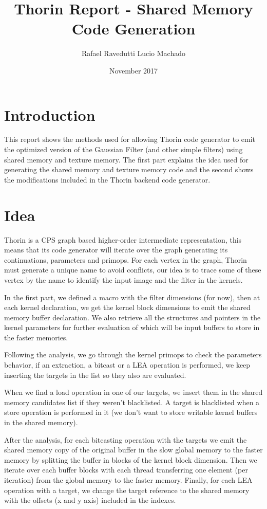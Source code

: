 \documentclass{article}
\title{Thorin Report - Shared Memory Code Generation}
\author{Rafael Ravedutti Lucio Machado }
\date{November 2017}
\begin{document}
\maketitle

\section{Introduction}
This report shows the methods used for allowing Thorin code generator to emit the optimized version of the Gaussian Filter (and other simple filters) using shared memory and texture memory. The first part explains the idea used for generating the shared memory and texture memory code and the second shows the modifications included in the Thorin backend code generator.

\section{Idea}
Thorin is a CPS graph based higher-order intermediate representation, this means that its code generator will iterate over the graph generating its continuations, parameters and primops. For each vertex in the graph, Thorin must generate a unique name to avoid conflicts, our idea is to trace some of these vertex by the name to identify the input image and the filter in the kernels.

In the first part, we defined a macro with the filter dimensions (for now), then at each kernel declaration, we get the kernel block dimensions to emit the shared memory buffer declaration. We also retrieve all the structures and pointers in the kernel parameters for further evaluation of which will be input buffers to store in the faster memories.

Following the analysis, we go through the kernel primops to check the parameters behavior, if an extraction, a bitcast or a LEA operation is performed, we keep inserting the targets in the list so they also are evaluated.

When we find a load operation in one of our targets, we insert them in the shared memory candidates list if they weren't blacklisted. A target is blacklisted when a store operation is performed in it (we don't want to store writable kernel buffers in the shared memory).

After the analysis, for each bitcasting operation with the targets we emit the shared memory copy of the original buffer in the slow global memory to the faster memory by splitting the buffer in blocks of the kernel block dimension. Then we iterate over each buffer blocks with each thread transferring one element (per iteration) from the global memory to the faster memory. Finally, for each LEA operation with a target, we change the target reference to the shared memory with the offsets (x and y axis) included in the indexes.
\end{document}
